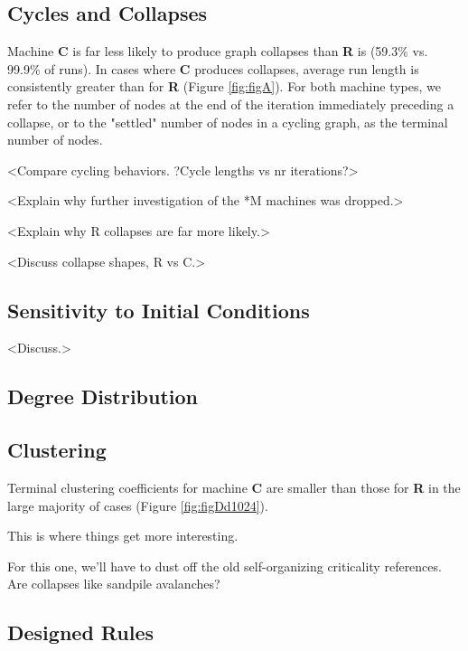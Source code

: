 \documentclass[twoside,twocolumn]{article}
\begin{document}
\subsection{Cycles and Collapses}

Machine \textbf{C} is far less likely to produce graph collapses than
\textbf{R} is (59.3\% vs. 99.9\% of runs). In cases where \textbf{C} produces
collapses, average run length is consistently greater than
for \textbf{R} (Figure \ref{fig:figA}). For both machine types, we refer to
the number of nodes at the end of the iteration immediately preceding a collapse,
or to the "settled" number of nodes in a cycling graph, as the terminal number of nodes.

<Compare cycling behaviors. ?Cycle lengths vs nr iterations?>

<Explain why further investigation of the *M machines was dropped.>

<Explain why R collapses are far more likely.>

<Discuss collapse shapes, R vs C.>

\subsection{Sensitivity to Initial Conditions}

<Discuss.>

\subsection{Degree Distribution}

\subsection{Clustering}

Terminal clustering coefficients for machine \textbf{C} are smaller than those for \textbf{R} in
the large majority of cases (Figure \ref{fig:figDd1024}).

This is where things get more interesting.

For this one, we'll have to dust off the old self-organizing criticality
references. Are collapses like sandpile avalanches?

\subsection{Designed Rules}
\end{document}
